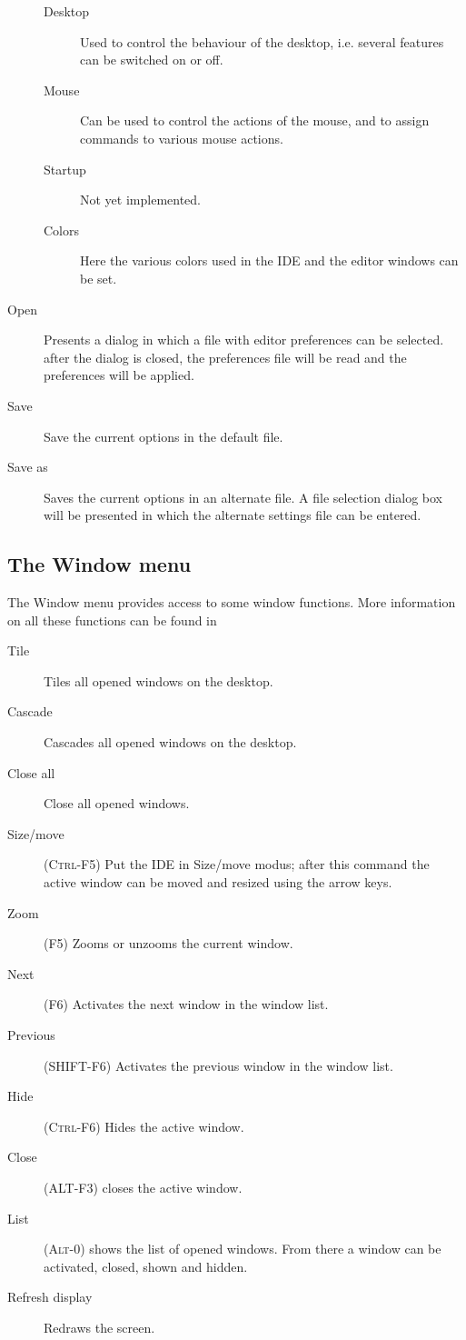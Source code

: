 \begin{description}
\begin{description}
\item[Desktop]
Used to control the behaviour of the desktop, i.e. several features can be
switched on or off.
\item[Mouse]
Can be used to control the actions of the mouse, and to assign commands to
various mouse actions.
\item[Startup]
Not yet implemented.
\item[Colors]
Here the various colors used in the IDE and the editor windows can be set.
\end{description}
\item[Open]
Presents a dialog in which a file with editor preferences can be selected. 
after the dialog is closed, the preferences file will be read and the
preferences will be applied.
\item[Save]
Save the current options in the default file.
\item[Save as]
Saves the current options in an alternate file. A file selection dialog box
will be presented in which the alternate settings file can be entered.
\end{description}
%
%
\subsection{The Window menu}
\label{se:menuwindow}
The Window menu provides access to some window functions. More information
on all these functions can be found in 
\begin{description}
\item[Tile]
Tiles all opened windows on the desktop.
\item[Cascade]
Cascades all opened windows on the desktop.
\item[Close all]
Close all opened windows.
\item[Size/move] (\textsc{Ctrl-F5})
Put the IDE in Size/move modus; after this command the active window can be
moved and resized using the arrow keys.
\item[Zoom] (\textsc{F5})
Zooms or unzooms the current window. 
\item[Next] (\textsc{F6})
Activates the next window in the window list.
\item[Previous] (\textsc{SHIFT-F6})
Activates the previous window in the window list.
\item[Hide] (\textsc{Ctrl-F6})
Hides the active window. 
\item[Close] (\textsc{ALT-F3}) closes the active window.
\item[List] (\textsc{Alt-0}) shows the list of opened windows. From there a
window can be activated, closed, shown and hidden.
\item[Refresh display]
Redraws the screen.
\end{description}
%
%
